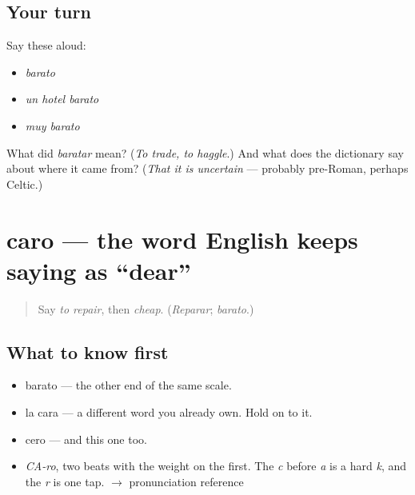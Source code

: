 \subsection*{Your turn}
Say these aloud:

\begin{itemize}
\raggedright
  \item \emph{barato}
  \item \emph{un hotel barato}
  \item \emph{muy barato}
\end{itemize}

\begin{tcolorbox}[breakable,colback=teal!4,colframe=teal!35!black,title={Before you move on}]
What did \emph{baratar} mean? (\emph{To trade, to haggle}.) And what does the dictionary say about where it came from? (\emph{That it is uncertain} — probably pre-Roman, perhaps Celtic.)
\end{tcolorbox}
\section[caro]{caro — the word English keeps saying as \textquotedblleft{}dear\textquotedblright{}}

\label{lesson:ES-C397-caro}



\begin{quote}
Say \emph{to repair}, then \emph{cheap}. (\emph{Reparar}; \emph{barato}.)
\end{quote}

\subsection*{What to know first}
\begin{itemize}
\raggedright
  \item barato — the other end of the same scale.
  \item la cara — a different word you already own. Hold on to it.
  \item cero — and this one too.
\end{itemize}

\begin{sounds}
\begin{itemize}
\raggedright
  \item \emph{CA-ro}, two beats with the weight on the first. The \emph{c} before \emph{a} is a hard \emph{k}, and the \emph{r} is one tap. $\to$ pronunciation reference
\end{itemize}
\end{sounds}


